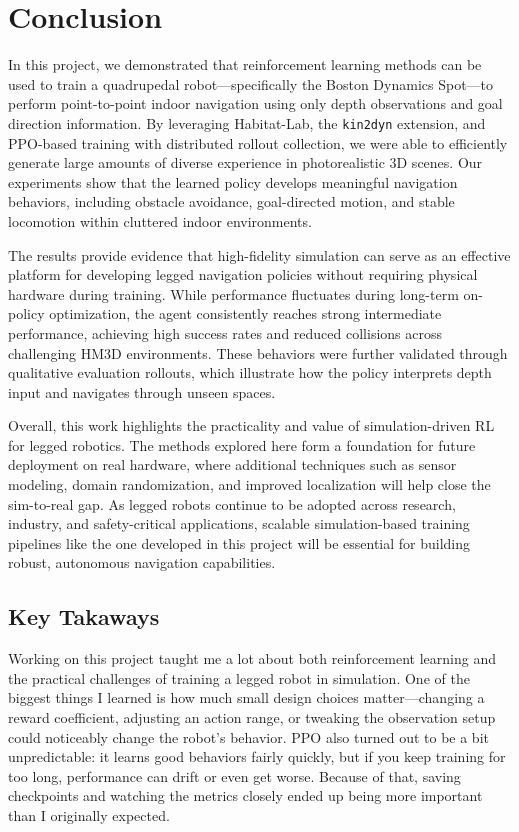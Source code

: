 \documentclass{article} %
\begin{document}
\section{Conclusion}
In this project, we demonstrated that reinforcement learning methods can be used to train a quadrupedal robot—specifically the Boston Dynamics Spot—to perform point-to-point indoor navigation using only depth observations and goal direction information. By leveraging Habitat-Lab, the \texttt{kin2dyn} extension, and PPO-based training with distributed rollout collection, we were able to efficiently generate large amounts of diverse experience in photorealistic 3D scenes. Our experiments show that the learned policy develops meaningful navigation behaviors, including obstacle avoidance, goal-directed motion, and stable locomotion within cluttered indoor environments.

The results provide evidence that high-fidelity simulation can serve as an effective platform for developing legged navigation policies without requiring physical hardware during training. While performance fluctuates during long-term on-policy optimization, the agent consistently reaches strong intermediate performance, achieving high success rates and reduced collisions across challenging HM3D environments. These behaviors were further validated through qualitative evaluation rollouts, which illustrate how the policy interprets depth input and navigates through unseen spaces.

Overall, this work highlights the practicality and value of simulation-driven RL for legged robotics. The methods explored here form a foundation for future deployment on real hardware, where additional techniques such as sensor modeling, domain randomization, and improved localization will help close the sim-to-real gap. As legged robots continue to be adopted across research, industry, and safety-critical applications, scalable simulation-based training pipelines like the one developed in this project will be essential for building robust, autonomous navigation capabilities.

\subsection{Key Takaways}
Working on this project taught me a lot about both reinforcement learning and the practical challenges of training a legged robot in simulation. One of the biggest things I learned is how much small design choices matter—changing a reward coefficient, adjusting an action range, or tweaking the observation setup could noticeably change the robot’s behavior. PPO also turned out to be a bit unpredictable: it learns good behaviors fairly quickly, but if you keep training for too long, performance can drift or even get worse. Because of that, saving checkpoints and watching the metrics closely ended up being more important than I originally expected.
\end{document}
